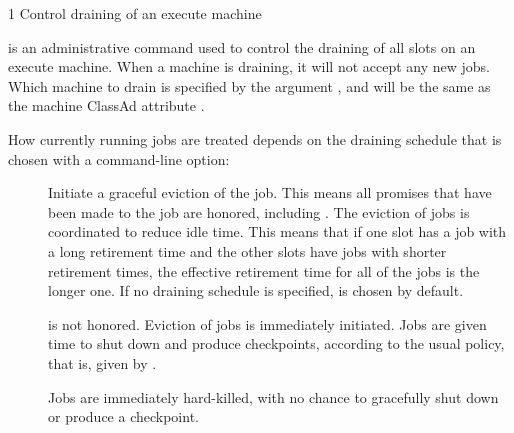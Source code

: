\begin{ManPage}
{\label{man-condor-drain}}{1}
{Control draining of an execute machine}

\Synopsis {}

\ToolDebugOption
{}

\ToolDebugOption
{}

\Description

 is an administrative command used to control the draining
of all slots on an execute machine.  
When a machine is draining, 
it will not accept any new jobs.  
Which machine to drain is specified by the argument ,
and will be the same as the machine ClassAd attribute . 

How currently running jobs are treated 
depends on the draining schedule that is chosen with a command-line option:

\begin{description}

\item[] Initiate a graceful eviction of the job.  
This means all promises that have been made to the job are honored, 
including .  
The eviction of jobs is coordinated to reduce idle time.  
This means that if one slot has a job with a long
retirement time and the other slots have jobs with shorter retirement times, 
the effective retirement time for all of the jobs is the longer one.
If no draining schedule is specified, 
 is chosen by default.

\item[]  is not honored.  
Eviction of jobs is immediately initiated.  
Jobs are given time to shut down and produce checkpoints,
 according to the usual policy, that is, 
given by .

\item[] Jobs are immediately hard-killed,
with no chance to gracefully shut down or produce a checkpoint.

\end{description}


\end{ManPage}
